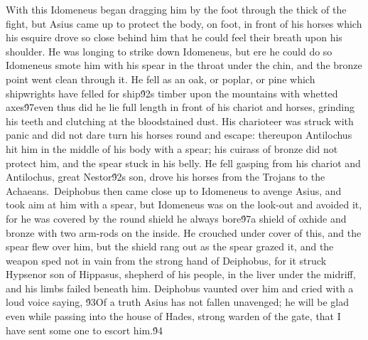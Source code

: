 {With this Idomeneus began dragging him by the foot through the thick of the fight, but Asius came up to protect the body, on foot, in front of his horses which his esquire drove so close behind him that he could feel their breath upon his shoulder. He was longing to strike down Idomeneus, but ere he could do so Idomeneus smote him with his spear in the throat under the chin, and the bronze point went clean through it. He fell as an oak, or poplar, or pine which shipwrights have felled for ship\'92s timber upon the mountains with whetted axes\'97even thus did he lie full length in front of his chariot and horses, grinding his teeth and clutching at the bloodstained dust. His charioteer was struck with panic and did not dare turn his horses round and escape: thereupon Antilochus hit him in the middle of his body with a spear; his cuirass of bronze did not protect him, and the spear stuck in his belly. He fell gasping from his chariot and Antilochus, great Nestor\'92s son, drove his horses from the Trojans to the Achaeans.\
Deiphobus then came close up to Idomeneus to avenge Asius, and took aim at him with a spear, but Idomeneus was on the look-out and avoided it, for he was covered by the round shield he always bore\'97a shield of oxhide and bronze with two arm-rods on the inside. He crouched under cover of this, and the spear flew over him, but the shield rang out as the spear grazed it, and the weapon sped not in vain from the strong hand of Deiphobus, for it struck Hypsenor son of Hippasus, shepherd of his people, in the liver under the midriff, and his limbs failed beneath him. Deiphobus vaunted over him and cried with a loud voice saying, \'93Of a truth Asius has not fallen unavenged; he will be glad even while passing into the house of Hades, strong warden of the gate, that I have sent some one to escort him.\'94\
}
